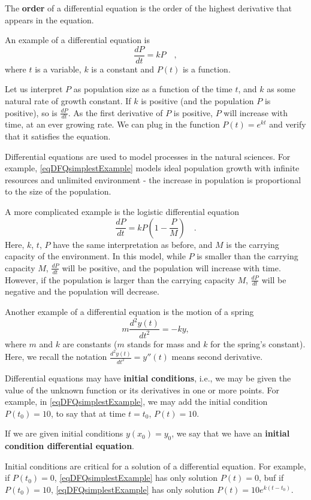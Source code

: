 \documentclass[12pt]{book}
\renewcommand{\emph}{\textbf}
\begin{document}
The \emph{order} of a differential equation is the order of the highest derivative that appears in the equation.

An example of a differential equation is
\begin{equation}\label{eqDFQsimplestExample}
\frac{dP}{dt} = k P\quad ,
\end{equation}
where $t$ is a variable, $k$ is a constant and $P(t)$ is a function.

Let us interpret $P$ as population size as a function of the time $t$, and $k$ as some natural rate of growth constant. If $k$ is positive (and the population $P$ is positive), so is $\frac{d P}{dt}$. As the first derivative of $P$ is positive, $P$ will increase with time, at an ever growing rate. We can plug in the function $P(t)= e^{k t}$ and verify that it satisfies the equation.

Differential equations are used to model processes in the natural sciences. For example, \ref{eqDFQsimplestExample} models ideal population growth with infinite resources and unlimited environment - the increase in population is proportional to the size of the population.

A more complicated example is the logistic differential equation 
\[
\frac{d P }{dt} = k P(1- \frac{P}{M})\quad.
\]
Here, $k$, $t$, $P$ have the same interpretation as before, and $M$ is the carrying capacity of the environment. In this model, while $P$ is smaller than the carrying capacity $M$,  $\frac{dP}{dt}$ will be positive, and the population will increase with time. However, if the population is larger than the carrying capacity $M$, $\frac{d P }{dt}$ will be negative and the population will decrease.

Another example of a differential equation is the motion of a spring
\[
m\frac{d^2 y (t)}{dt^2}= -k y,
\]
where $m$ and $k$ are constants ($m$ stands for mass and $k$ for the spring's constant). Here, we recall the notation $\frac{d^2 y (t)}{dt^2}= y''(t)$ means second derivative.


Differential equations may have \emph{initial conditions}, i.e., we may be given the value of the unknown function or its derivatives in one or more points. For example, in \eqref{eqDFQsimplestExample}, we may add the initial condition $P(t_0)= 10$, to say that at time $t=t_0$, $P(t)=10$. 

If we are given initial conditions $y(x_0)=y_0$, we say that we have  an \emph{initial condition differential equation}.

Initial conditions are critical for a solution of a differential equation. For example, if $P(t_0)=0$, \eqref{eqDFQsimplestExample} has only solution $P(t)=0$, buf if $P(t_0)=10$, \eqref{eqDFQsimplestExample} has only solution $P(t)=10  e^{k(t-t_0)}$.
\end{document}
